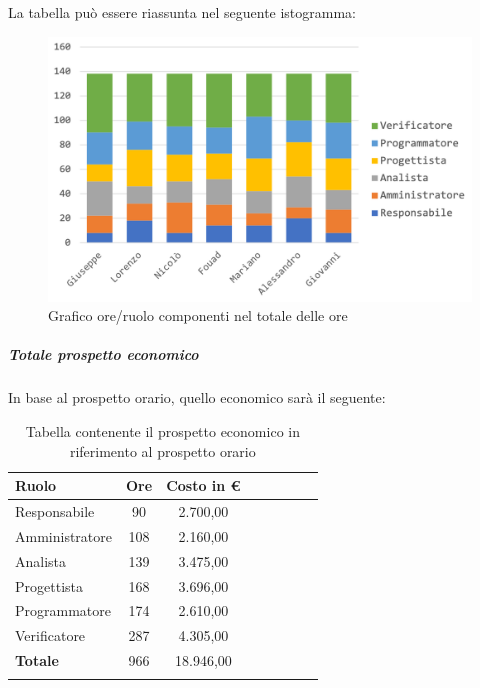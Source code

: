 			La tabella può essere riassunta nel seguente istogramma:
			\begin{figure}[H]
				\centering
				\includegraphics[width=0.8\linewidth]{./images/preventivo/totOre1.png}
				\caption{Grafico ore/ruolo componenti nel totale delle ore}
				\label{fig:grafico suddivione ruoli totale ore}
			\end{figure}
			
			\subparagraph{Totale prospetto economico}
			In base al prospetto orario, quello economico sarà il seguente: 
			
			\begin{longtable}{|l|c|c|c|c|c|c|c|}
				\hline
				\rowcolor{lighter-grayer}
				\textbf{Ruolo} & \textbf{Ore} & \textbf{Costo in € } \\
				\hline
				\endfirsthead
				
				\hline
				Responsabile 	    & 90 & 2.700,00\\
				\hline 
				\hline
				Amministratore	  & 108 & 2.160,00\\
				\hline
				\hline
				Analista 				& 139 & 3.475,00\\
				\hline
				\hline
				Progettista 		  & 168 & 3.696,00\\
				\hline
				\hline
				Programmatore 	 & 174 & 2.610,00\\
				\hline
				\hline
				Verificatore 		  & 287 & 4.305,00\\
				\hline
				\textbf{Totale} 	& 966 & 18.946,00\\
				\hline
				\caption{Tabella contenente il prospetto economico in riferimento al prospetto orario}
			\end{longtable}
			\pagebreak
			
